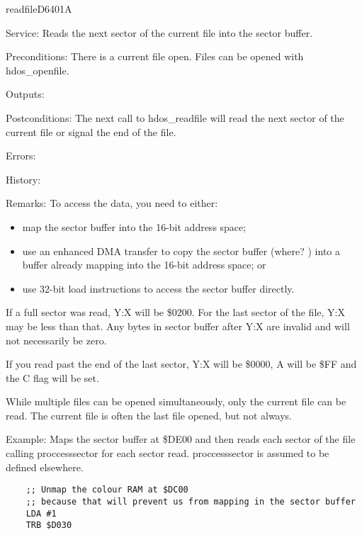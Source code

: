 \newpage
\begin{hyppotrap}{readfile}{D640}{1A}
\item [Service:]
  Reads the next sector of the current file into the sector buffer.
\item [Preconditions:]
  There is a current file open. Files can be opened with hdos\_openfile.
\item [Outputs:]
\item [Postconditions:]
  The next call to hdos\_readfile will read the next sector of the current file
  or signal the end of the file.
\item [Errors:]
  \TODO
\item [History:]
\item [Remarks:]
  To access the data, you need to either:
  \begin{itemize}
    \item map the sector buffer into the 16-bit address space;
    \item use an enhanced DMA transfer to copy the sector buffer (where? \TODO)
          into a buffer already mapping into the 16-bit address space; or
    \item use 32-bit load instructions to access the sector buffer directly.
  \end{itemize}

  If a full sector was read, Y:X will be \$0200. For the last sector of the
  file, Y:X may be less than that. Any bytes in sector buffer after Y:X are
  invalid and will not necessarily be zero.

  If you read past the end of the last sector, Y:X will be \$0000, A will be
  \$FF and the C flag will be set.

  While multiple files can be opened simultaneously, only the current file can
  be read. The current file is often the last file opened, but not always.
\item [Example:]
  Maps the sector buffer at \$DE00 and then reads each sector of the file calling
  proccesssector for each sector read. proccesssector is assumed to be defined
  elsewhere.
\begin{tcolorbox}[colback=black,coltext=white]
\verbatimfont{\codefont}
\begin{verbatim}
    ;; Unmap the colour RAM at $DC00
    ;; because that will prevent us from mapping in the sector buffer
    LDA #1
    TRB $D030
\end{verbatim}
\end{tcolorbox}


\end{hyppotrap}
